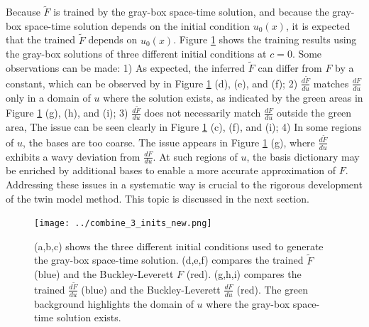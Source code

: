Because $\tilde{F}$ is trained by
the gray-box space-time solution, and because the gray-box space-time solution depends on
the initial condition $u_0(x)$, it is expected
that the trained $\tilde{F}$ depends on $u_0(x)$. 
Figure \ref{fig: combine 3} shows the training results using the gray-box solutions of
three different initial conditions at $c=0$.
Some observations can be made: 1) As expected, the inferred 
$\tilde{F}$ can differ from $F$ by a constant, which
can be observed by in Figure \ref{fig: combine 3} (d), (e), and (f); 
2) $\frac{d\tilde{F}}{du}$ matches $\frac{dF}{du}$ only in a
domain of $u$ where the solution exists, as indicated by the green areas in 
Figure \ref{fig: combine 3} (g), (h), and (i);
3) $\frac{d\tilde{F}}{du}$ does not necessarily match $\frac{dF}{du}$ outside the green area, 
The issue can be seen clearly in Figure \ref{fig: combine 3} (c), (f), and (i);
4) In some regions of $u$, the bases are too coarse. The issue appears
in Figure \ref{fig: combine 3} (g), where $\frac{d\tilde{F}}{du}$ exhibits
a wavy deviation from $\frac{dF}{du}$. At such regions of $u$, the basis dictionary may be enriched 
by additional bases to enable a more accurate approximation of $F$.
Addressing these issues in a systematic way is crucial to the rigorous development of
the twin model method. This topic is discussed in the next section.\\

\begin{figure}[htbp]
\begin{center}
    \texttt{[image: ../combine\_3\_inits\_new.png]}
    \caption{(a,b,c) shows the three different initial conditions used to generate
             the gray-box space-time solution. (d,e,f) compares the trained $\tilde{F}$ 
             (blue) and the Buckley-Leverett $F$ (red). (g,h,i) compares
             the trained $\frac{d\tilde{F}}{du}$ (blue) and the Buckley-Leverett 
             $\frac{dF}{du}$ (red). The green background highlights the domain of $u$ where
             the gray-box space-time solution exists.}
    \label{fig: combine 3}
\end{center}
\end{figure}


